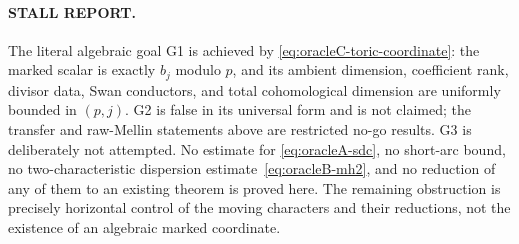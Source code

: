 \paragraph{STALL REPORT.}
The literal algebraic goal G1 is achieved by
\eqref{eq:oracleC-toric-coordinate}: the marked scalar is exactly $b_j$
modulo $p$, and its ambient dimension, coefficient rank, divisor data,
Swan conductors, and total cohomological dimension are uniformly bounded
in $(p,j)$.  G2 is false in its universal form and is not claimed; the
transfer and raw-Mellin statements above are restricted no-go results.
G3 is deliberately not attempted.  No estimate for
\eqref{eq:oracleA-sdc}, no short-arc bound, no two-characteristic
dispersion estimate~\eqref{eq:oracleB-mh2}, and no reduction of any of
them to an existing theorem is proved here.  The remaining obstruction is
precisely horizontal control of the moving characters and their reductions,
not the existence of an algebraic marked coordinate.
